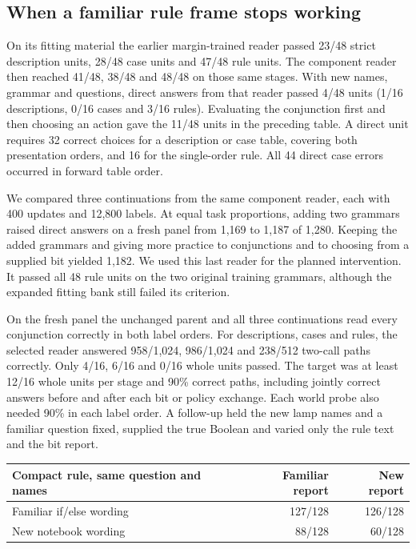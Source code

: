 \documentclass[11pt]{article}
\begin{document}
\subsection{When a familiar rule frame stops working}

On its fitting material the earlier margin-trained reader passed 23/48 strict description units, 28/48 case units and 47/48 rule units. The component reader then reached 41/48, 38/48 and 48/48 on those same stages. With new names, grammar and questions, direct answers from that reader passed 4/48 units (1/16 descriptions, 0/16 cases and 3/16 rules). Evaluating the conjunction first and then choosing an action gave the 11/48 units in the preceding table. A direct unit requires 32 correct choices for a description or case table, covering both presentation orders, and 16 for the single-order rule. All 44 direct case errors occurred in forward table order.

We compared three continuations from the same component reader, each with 400 updates and 12,800 labels. At equal task proportions, adding two grammars raised direct answers on a fresh panel from 1,169 to 1,187 of 1,280. Keeping the added grammars and giving more practice to conjunctions and to choosing from a supplied bit yielded 1,182. We used this last reader for the planned intervention. It passed all 48 rule units on the two original training grammars, although the expanded fitting bank still failed its criterion.

On the fresh panel the unchanged parent and all three continuations read every conjunction correctly in both label orders. For descriptions, cases and rules, the selected reader answered 958/1,024, 986/1,024 and 238/512 two-call paths correctly. Only 4/16, 6/16 and 0/16 whole units passed. The target was at least 12/16 whole units per stage and 90\% correct paths, including jointly correct answers before and after each bit or policy exchange. Each world probe also needed 90\% in each label order. A follow-up held the new lamp names and a familiar question fixed, supplied the true Boolean and varied only the rule text and the bit report.

\begin{center}
\small\renewcommand{\arraystretch}{1.15}
\begin{tabular}{@{}lrr@{}}
\toprule
Compact rule, same question and names & Familiar report & New report \\
\midrule
Familiar if/else wording & 127/128 & 126/128 \\
New notebook wording & 88/128 & 60/128 \\
\bottomrule
\end{tabular}
\end{center}
\end{document}
